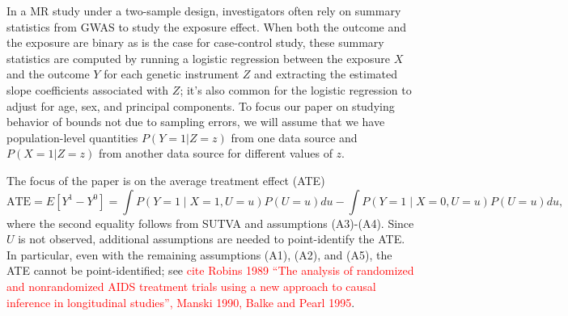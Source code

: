 \documentclass[
]{article}
\theoremstyle{plain}
\begin{document}
In a MR study under a two-sample design, investigators often rely on summary statistics from GWAS to study the exposure effect. When both the outcome and the exposure are binary as is the case for case-control study, these summary statistics are computed by running a logistic regression between the exposure $X$ and the outcome $Y$ for each genetic instrument $Z$ and extracting the estimated slope coefficients associated with $Z$; it's also common for the logistic regression to adjust for age, sex, and principal components. To focus our paper on studying behavior of bounds not due to sampling errors, we will assume that we have population-level quantities $P(Y =1 | Z= z)$ from one data source and $P(X=1|Z=z)$ from another data source for different values of $z$.

The focus of the paper is on the average treatment effect (ATE)
\[
\text{ATE} = E[Y^1 - Y^0] = \int P(Y=1 \mid X = 1, U=u) P(U=u) du - \int P(Y=1 \mid X = 0, U=u) P(U=u) du, 
\]
where the second equality follows from SUTVA and assumptions (A3)-(A4). Since $U$ is not observed, additional assumptions are needed to point-identify the ATE. In particular, even with the remaining assumptions (A1), (A2), and (A5), the ATE cannot be point-identified; see \textcolor{red}{cite Robins 1989 ``The analysis of randomized and nonrandomized AIDS treatment trials using a new approach to
causal inference in longitudinal studies'', Manski 1990, Balke and Pearl 1995}. 
\end{document}
